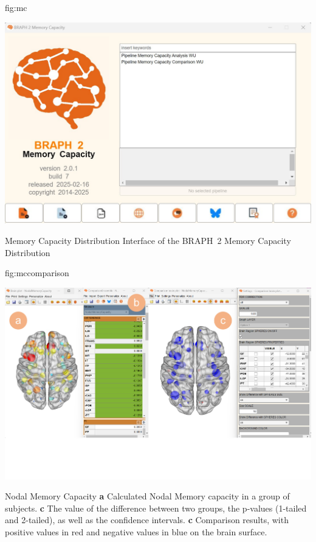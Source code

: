 \documentclass{tufte-handout}
\begin{document}
{fig:mc}
{\centerline{\includegraphics{fig04.jpg}}}
{Memory Capacity Distribution}
{
	Interface of the BRAPH~2 Memory Capacity Distribution
}

{fig:mccomparison}
{\centerline{\includegraphics{fig05.jpg}}}
{Nodal Memory Capacity}
{
	{\bf a} Calculated Nodal Memory capacity in a group of subjects.
	{\bf c} The value of the difference between two groups, the p-values (1-tailed and 2-tailed), as well as the confidence intervals. 
	{\bf c} Comparison results, with positive values in red and negative values in blue on the brain surface.
}

\end{document}
